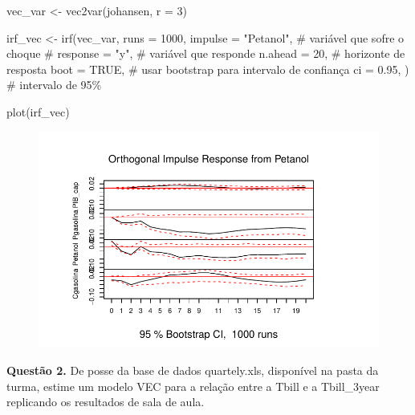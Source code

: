 \documentclass[
  letterpaper,
  DIV=11,
  numbers=noendperiod]{scrartcl}
\newenvironment{Shaded}{\begin{snugshade}}{\end{snugshade}}
\newcommand{\AttributeTok}[1]{\textcolor[rgb]{0.40,0.45,0.13}{#1}}
\newcommand{\CommentTok}[1]{\textcolor[rgb]{0.37,0.37,0.37}{#1}}
\newcommand{\ConstantTok}[1]{\textcolor[rgb]{0.56,0.35,0.01}{#1}}
\newcommand{\DecValTok}[1]{\textcolor[rgb]{0.68,0.00,0.00}{#1}}
\newcommand{\FloatTok}[1]{\textcolor[rgb]{0.68,0.00,0.00}{#1}}
\newcommand{\FunctionTok}[1]{\textcolor[rgb]{0.28,0.35,0.67}{#1}}
\newcommand{\NormalTok}[1]{\textcolor[rgb]{0.00,0.23,0.31}{#1}}
\newcommand{\OtherTok}[1]{\textcolor[rgb]{0.00,0.23,0.31}{#1}}
\newcommand{\StringTok}[1]{\textcolor[rgb]{0.13,0.47,0.30}{#1}}
\begin{document}
\begin{Shaded}
\begin{Highlighting}[]
\NormalTok{vec\_var }\OtherTok{\textless{}{-}} \FunctionTok{vec2var}\NormalTok{(johansen, }\AttributeTok{r =} \DecValTok{3}\NormalTok{)}

\NormalTok{irf\_vec }\OtherTok{\textless{}{-}} \FunctionTok{irf}\NormalTok{(vec\_var,}
               \AttributeTok{runs =} \DecValTok{1000}\NormalTok{,}
               \AttributeTok{impulse =} \StringTok{"Petanol"}\NormalTok{,     }\CommentTok{\# variável que sofre o choque}
              \CommentTok{\# response = "y",    \# variável que responde}
               \AttributeTok{n.ahead =} \DecValTok{20}\NormalTok{,      }\CommentTok{\# horizonte de resposta}
               \AttributeTok{boot =} \ConstantTok{TRUE}\NormalTok{,       }\CommentTok{\# usar bootstrap para intervalo de confiança}
               \AttributeTok{ci =} \FloatTok{0.95}\NormalTok{,}
\NormalTok{               )         }\CommentTok{\# intervalo de 95\%}

\FunctionTok{plot}\NormalTok{(irf\_vec)}
\end{Highlighting}
\end{Shaded}

\begin{figure}[H]

{\centering \includegraphics{Homework4_files/figure-pdf/unnamed-chunk-5-1.pdf}

}

\end{figure}

\textbf{Questão 2.} De posse da base de dados quartely.xls, disponível
na pasta da turma, estime um modelo VEC para a relação entre a Tbill e a
Tbill\_3year replicando os resultados de sala de aula.
\end{document}
